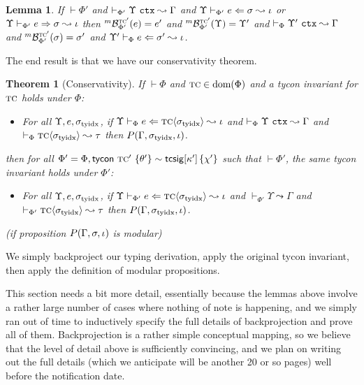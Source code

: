 \documentclass[12pt]{article}
\newtheorem{theorem}{Theorem}
\newtheorem{lemma}{Lemma}
\newenvironment{proof-sketch}{\noindent{\emph{Proof Sketch.}}}{\qed}
\begin{document}
\begin{lemma}
If $\vdash \Phi'$ and $\vdash_{\Phi'} \Upsilon~\mathtt{ctx} \leadsto \Gamma$ and $\Upsilon \vdash_{\Phi'} e \Leftarrow \sigma \leadsto \iota$ or $\Upsilon \vdash_{\Phi'} e \Rightarrow \sigma \leadsto \iota$ then ${}^{m}\mathcal{B}_{\Phi'}^{\textsc{tc}'}(e)=e'$ and ${}^{m}\mathcal{B}_{\Phi'}^{\textsc{tc}'}(\Upsilon)=\Upsilon'$ and $\vdash_{\Phi} \Upsilon'~\mathtt{ctx} \leadsto \Gamma$ and ${}^{m}\mathcal{B}_{\Phi'}^{\textsc{tc}'}(\sigma)=\sigma'$ and $\Upsilon' \vdash_{\Phi} e \Leftarrow \sigma' \leadsto \iota$.
\end{lemma}

The end result is that we have our conservativity theorem.

\begin{theorem}[Conservativity]\label{thm:conservativity} If $\vdash \Phi$ and $\textsc{tc} \in \text{dom}(\Phi)$ and a tycon invariant for $\textsc{tc}$ holds under $\Phi$: \begin{itemize}
\item For all $\Upsilon, e, \sigma_\text{tyidx}$, if $\Upsilon \vdash_{\Phi} e \Leftarrow {\textsc{tc}}\langle\sigma_\text{tyidx}\rangle \leadsto \iota$ and $\vdash_{\Phi} \Upsilon~\mathtt{ctx} \leadsto \Gamma$ and $\vdash_\Phi {{\textsc{tc}}\langle\sigma_\text{tyidx}\rangle} \leadsto \tau$  then $P(\Gamma, \sigma_\text{tyidx}, \iota)$.
\end{itemize} then for all $\Phi' = \Phi, {\sf tycon}~\textsc{tc}' ~\{\theta'\} \sim {\sf tcsig}[\kappa']\,\{\chi'\}$ such that $\vdash \Phi'$, the same tycon invariant holds under $\Phi'$: \begin{itemize}
\item For all $\Upsilon, e, \sigma_\text{tyidx}$, if $\Upsilon \vdash_{\Phi'} e \Leftarrow {\textsc{tc}}\langle\sigma_\text{tyidx}\rangle \leadsto \iota$ and $\vdash_{\Phi'} \Upsilon \leadsto \Gamma$ and $\vdash_{\Phi'}{{\textsc{tc}}\langle\sigma_\text{tyidx}\rangle}\leadsto{\tau}$ then $P(\Gamma, \sigma_\text{tyidx}, \iota)$.
\end{itemize}
(if proposition $P(\Gamma, \sigma, \iota)$ is \emph{modular})
\end{theorem}
\begin{proof-sketch}
We simply backproject our typing derivation, apply the original tycon invariant, then apply the definition of modular propositions.\end{proof-sketch}

This section needs a bit more detail, essentially because the lemmas above involve a rather large number of cases where nothing of note is happening, and we simply ran out of time to inductively specify the full details of backprojection and prove all of them. Backprojection is a rather simple conceptual mapping, so we believe that the level of detail above is sufficiently convincing, and we plan on writing out the full details (which we anticipate will be another 20 or so pages) well before the notification date.
\end{document}
